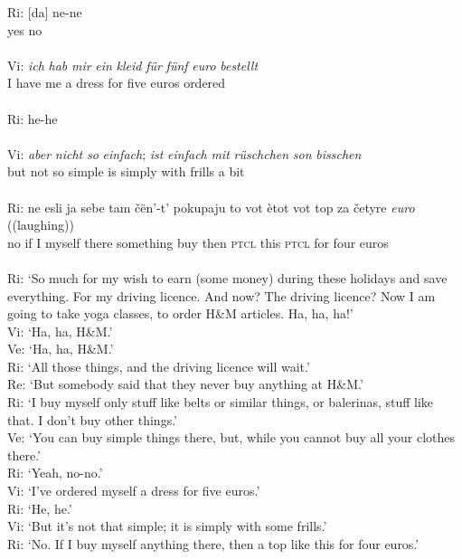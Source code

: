 \gll Ri: [da] ne-ne\\
    {} {yes} no\\
\glt \hfill \\

\gll Vi: \textit{ich} \textit{hab} \textit{mir} \textit{ein} \textit{kleid} \textit{für} \textit{fünf} \textit{euro} \textit{bestellt}\\
    {} I have me a dress for five euros ordered\\
\glt \hfill \\

\gll Ri: he-he\\
    {} {}\\

\gll Vi: \textit{aber} \textit{nicht} \textit{so} \textit{einfach}; \textit{ist} \textit{einfach} \textit{mit} \textit{rüschchen} \textit{so\textunderscore{}n} \textit{bisschen}\\
    {} but not so simple is simply with frills a bit\\
\glt \hfill \\

\gll Ri: ne esli ja sebe tam čën'-t' pokupaju to vot ètot vot top \phantom{nn} za četyre \textit{euro} ((laughing))\\
    {} no if I myself there something buy then \textsc{ptcl} this \textsc{ptcl} {} {} for four euros\\
\glt \hfill \\

Ri: `So much for my wish to earn (some money) during these holidays \phantom{mn} \phantom{mn} and save everything. For my driving licence. And now? The driving \phantom{mn} licence? Now I am going to take yoga classes, to order H{\&}M articles. \phantom{mn} Ha, ha, ha!'\\
Vi: `Ha, ha, H{\&}M.'\\
Ve: `Ha, ha, H{\&}M.'\\
Ri: `All those things, and the driving licence will wait.'\\
Re: `But somebody said that they never buy anything at H{\&}M.'\\
Ri: `I buy myself only stuff like belts or similar things, or balerinas, stuff \phantom{mn} like that. I don't buy other things.'\\
Ve: `You can buy simple things there, but, while you cannot buy all your \phantom{mn} clothes there.'\\
Ri: `Yeah, no-no.'\\
Vi: `I've ordered myself a dress for five euros.'\\
Ri: `He, he.'\\
Vi: `But it's not that simple; it is simply with some frills.'\\
Ri: `No. If I buy myself anything there, then a top like this for four euros.'
\z


